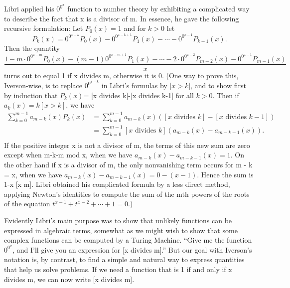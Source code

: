\documentclass[10pt]{article}
\begin{document}
Libri applied his $0^{0^{x}}$ function to number theory by exhibiting a complicated way to describe
the fact that x is a divisor of m. In essence, he gave the following recursive formulation: Let
$P_0(x)=1$ and for $k>0$ let
$$
P_k(x)=0^{0^{x-k}}P_0(x)-0^{0^{x-k+1}}P_1(x)-\cdots-0^{0^{x-1}}P_{k-1}(x).
$$
Then the quantity
$$
\frac{1-m\cdot0^{0^{x-m}}P_0(x)-(m-1)0^{0^{x-m+1}}P_1(x)-\cdots-2\cdot0^{0^{x-2}}P_{m-2}(x)-0^{0^{x-1}}P_{m-1}(x)}{x}
$$
turns out to equal 1 if x divides m, otherwise it is 0. (One way to prove this, Iverson-wise, is
to replace $0^{0^{x-k}}$ in Libri’s formulas by [$x>k$], and to show first by induction that $P_k(x)$=
[x divides k]-[x divides k-1] for all $k>0$. Then if $a_k(x)=k[x>k]$, we have
\begin{equation*}
\begin{aligned}
\sum_{k=0}^{m-1} a_{m-k} (x) P_k(x) &= \sum_{k=0}^{m-1} a_{m-k} (x) ([x \text{ divides } k] - [x \text{ divides } k-1])  \\
 &=  \sum_{k=0}^{m-1} [x \text{ divides } k] (a_{m-k} (x) - a_{m-k-1} (x)). \\
\end{aligned}
\end{equation*}
If the positive integer x is not a divisor of m, the terms of this new sum are zero except when
m-k-m mod x, when we have $a_{m-k}(x)-a_{m-k-1}(x)=1$. On the other hand if x is a divisor of m,
the only nonvanishing term occurs for m - k = x, when we have $a_{m-k}(x)-a_{m-k-1}(x)=0-(x-1)$.
Hence the sum is 1-x [x  m]. Libri obtained his complicated formula by a less direct method,
applying Newton’s identities to compute the sum of the mth powers of the roots of the equation
$t^{x-1} + t^{x-2} + \cdots + 1 = 0$.)

Evidently Libri’s main purpose was to show that unlikely functions can be expressed in algebraic terms, somewhat as we might wish to show that some complex functions can be computed
by a Turing Machine. “Give me the function $0^{0^{x}}$, and I’ll give you an expression for [x divides m].''
But our goal with Iverson’s notation is, by contrast, to find a simple and natural way to express
quantities that help us solve problems. If we need a function that is 1 if and only if x divides m,
we can now write [x divides m].
\end{document}
